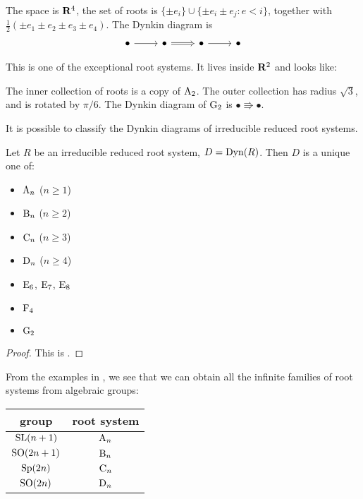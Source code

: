 \begin{example}
The space is $\mathbf{R}^4$, the set of roots is 
$\{\pm e_i\}\cup \{\pm e_i\pm e_j:e<i\}$, together with 
$\frac 1 2(\pm e_1\pm e_2\pm e_3\pm e_4)$. The Dynkin diagram is 
\[\begin{tikzcd}
  \bullet \ar[r] 
    & \bullet \ar[r, Rightarrow] 
    & \bullet \ar[r] 
    & \bullet
\end{tikzcd}\]
\end{example}

\begin{example}
This is one of the exceptional root systems. It lives inside $\mathbf{R}^2$ and looks 
like:
\begin{center}
\end{center}
The inner collection of roots is a copy of $\mathrm{A}_2$. The outer collection 
has radius $\sqrt 3$, and is rotated by $\pi/6$. The Dynkin diagram of 
$\mathrm{G}_2$ is $\bullet \Rrightarrow \bullet$. 
\end{example}

It is possible to classify the Dynkin diagrams of irreducible reduced root 
systems. 

\begin{theorem}
Let $R$ be an irreducible reduced root system, $D=\operatorname{Dyn}(R)$. Then $D$ is a 
unique one of: 
\begin{itemize}
  \item $\mathrm{A}_n$ ($n\geqslant 1$)
  \item $\mathrm{B}_n$ ($n\geqslant 2$)
  \item $\mathrm{C}_n$ ($n\geqslant 3$)
  \item $\mathrm{D}_n$ ($n\geqslant 4$)
  \item $\mathrm{E}_6$, $\mathrm{E}_7$, $\mathrm{E}_8$
  \item $\mathrm{F}_4$
  \item $\mathrm{G}_2$
\end{itemize}
\end{theorem}
\begin{proof}
This is \cite[VI \S 4.2 th.3]{bourbaki-lie-alg-4-6}. 
\end{proof}

From the examples in \cite[Ch.23]{milne-iAG}, we see that we can obtain all 
the infinite families of root systems from algebraic groups:
\begin{center}
\begin{tabular}{c|c}
  group & root system \\ \hline
  $\operatorname{SL}(n+1)$  & $\mathrm{A}_n$ \\
  $\operatorname{SO}(2n+1)$ & $\mathrm{B}_n$ \\
  $\operatorname{Sp}(2n)$   & $\mathrm{C}_n$ \\
  $\operatorname{SO}(2n)$   & $\mathrm{D}_n$ 
\end{tabular}
\end{center}

